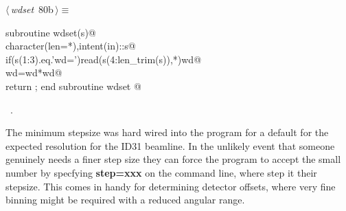 \documentclass[10pt,a4paper,notitlepage]{article}
\newcommand{\code}[1]{\textbf{\textsf{#1}}} %
\begin{document}
\begin{flushleft} \small
\begin{minipage}{\linewidth}\label{scrap91}\raggedright\small
{} $\langle\,${\it wdset}\nobreak\ {\footnotesize {80b}}$\,\rangle\equiv$
\vspace{-1ex}
\begin{list}{}{} \item
\mbox{}\verb@      subroutine wdset(s)@\\
\mbox{}\verb@      character(len=*),intent(in)::s@\\
\mbox{}\verb@      if(s(1:3).eq.'wd=')read(s(4:len_trim(s)),*)wd@\\
\mbox{}\verb@      wd=wd*wd@\\
\mbox{}\verb@      return ; end subroutine wdset                                        @{\NWsep}
\end{list}
\vspace{-1.5ex}
\footnotesize
\begin{list}{}{\setlength{\itemsep}{-\parsep}\setlength{\itemindent}{-\leftmargin}}
\item \NWtxtMacroRefIn\ .

\item{}
\end{list}
\end{minipage}\vspace{4ex}
\end{flushleft}
The minimum stepsize was hard wired into the program for a default for the 
expected resolution for the ID31 beamline. 
In the unlikely event that someone genuinely needs a finer step size they
can force the program to accept the small number by specfying \code{step=xxx} 
on the command line, where step it their stepsize. 
This comes in handy for determining detector offsets, where very fine binning
might be required with a reduced angular range.
\end{document}
